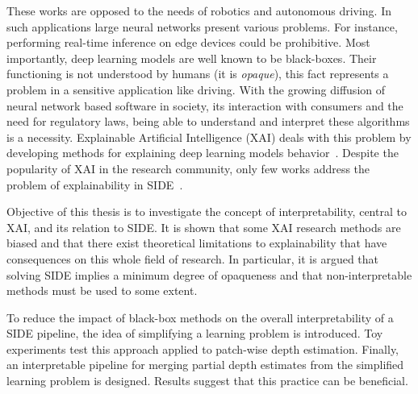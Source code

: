 These works are opposed to the needs of robotics and autonomous driving.
In such applications large neural networks present various problems.
For instance, performing real-time inference on edge devices could be prohibitive.
Most importantly, deep learning models are well known to be black-boxes.
Their functioning is not understood by humans (it is \textit{opaque}), this fact represents a problem in a sensitive application like driving.
With the growing diffusion of neural network based software in society, its interaction with consumers and the need for regulatory laws, being able to understand and interpret these algorithms is a necessity.
Explainable Artificial Intelligence (XAI) deals with this problem by developing methods for explaining deep learning models behavior~\cite{XAI_review}.
Despite the popularity of XAI in the research community, only few works address the problem of explainability in SIDE~\cite{Hu, Dijk, towards_interpretable}.

Objective of this thesis is to investigate the concept of interpretability, central to XAI, and its relation to SIDE.
It is shown that some XAI research methods are biased and that there exist theoretical limitations to explainability that have consequences on this whole field of research.
In particular, it is argued that solving SIDE implies a minimum degree of opaqueness and that non-interpretable methods must be used to some extent.

To reduce the impact of black-box methods on the overall interpretability of a SIDE pipeline, the idea of simplifying a learning problem is introduced.
Toy experiments test this approach applied to patch-wise depth estimation.
Finally, an interpretable pipeline for merging partial depth estimates from the simplified learning problem is designed.
Results suggest that this practice can be beneficial.


